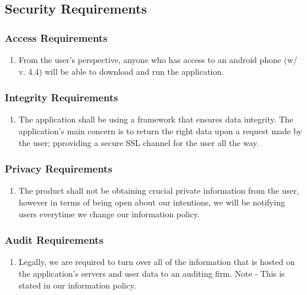 \documentclass[]{article}
\begin{document}

\subsection{Security Requirements}
\label{sub:security_requirements}

\subsubsection{Access Requirements}
\label{ssub:access_requirements}
\begin{enumerate}[{SR}1. ]
	\item From the user's perspective, anyone who has access to an android phone (w/ v. 4.4) will be able to download and run the application.
\end{enumerate}

\subsubsection{Integrity Requirements}
\label{ssub:integrity_requirements}
\begin{enumerate}[{SR}2. ]
	\item The application shall be using a framework that ensures data integrity. The application's main concern is to return the right data upon a request made by the user; pproviding a secure SSL channel for the user all the way.
\end{enumerate}

\subsubsection{Privacy Requirements}
\label{ssub:privacy_requirements}
\begin{enumerate}[{SR}3. ]
	\item The product shall not be obtaining crucial private information from the user, however in terms of being open about our intentions, we will be notifying users everytime we change our information policy.
\end{enumerate}

\subsubsection{Audit Requirements}
\label{ssub:audit_requirements}
\begin{enumerate}[{SR}4. ]
	\item Legally, we are required to turn over all of the information that is hosted on the application's servers and user data to an auditing firm. Note - This is stated in our information policy.
\end{enumerate}
\end{document}
